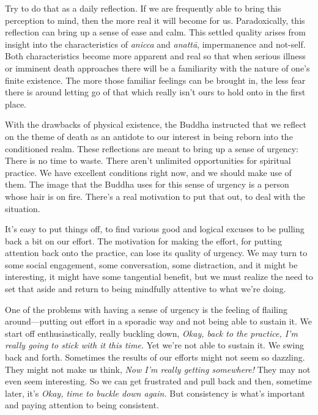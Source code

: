 Try to do that as a daily reflection. If we are frequently able to 
bring this perception to mind, then the more real it will become for 
us. Paradoxically, this reflection can bring up a sense of ease and 
calm. This settled quality arises from insight into the characteristics 
of \emph{anicca} and \emph{anattā}, impermanence and not-self. Both 
characteristics become more apparent and real so that when serious 
illness or imminent death approaches there will be a familiarity with 
the nature of one's finite existence. The more those familiar feelings 
can be brought in, the less fear there is around letting go of that 
which really isn't ours to hold onto in the first place.


With the drawbacks of physical existence, the Buddha instructed that we 
reflect on the theme of death as an antidote to our interest in being 
reborn into the conditioned realm. These reflections are meant to bring 
up a sense of urgency: There is no time to waste. There aren't 
unlimited opportunities for spiritual practice. We have excellent 
conditions right now, and we should make use of them. The image that 
the Buddha uses for this sense of urgency is a person whose hair is on 
fire. There's a real motivation to put that out, to deal with the 
situation.

It's easy to put things off, to find various good and logical excuses 
to be pulling back a bit on our effort. The motivation for making the 
effort, for putting attention back onto the practice, can lose its 
quality of urgency. We may turn to some social engagement, some 
conversation, some distraction, and it might be interesting, it might 
have some tangential benefit, but we must realize the need to set that 
aside and return to being mindfully attentive to what we're doing.

One of the problems with having a sense of urgency is the feeling of 
flailing around---putting out effort in a sporadic way and not being 
able to sustain it. We start off enthusiastically, really buckling 
down, \emph{Okay, back to the practice, I'm really going to stick with 
it this time.} Yet we're not able to sustain it. We swing back and 
forth. Sometimes the results of our efforts might not seem so dazzling. 
They might not make us think, \emph{Now I'm really getting somewhere!} 
They may not even seem interesting. So we can get frustrated and pull 
back and then, sometime later, it's \emph{Okay, time to buckle down 
again.} But consistency is what's important and paying attention to 
being consistent.

